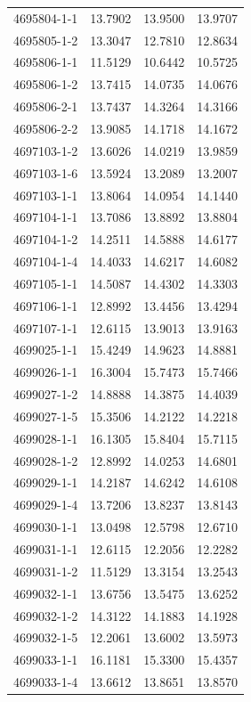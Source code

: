 \begin{longtable}{lrrr}
4695804-1-1 & 13.7902 & 13.9500 & 13.9707 \\
4695805-1-2 & 13.3047 & 12.7810 & 12.8634 \\
4695806-1-1 & 11.5129 & 10.6442 & 10.5725 \\
4695806-1-2 & 13.7415 & 14.0735 & 14.0676 \\
4695806-2-1 & 13.7437 & 14.3264 & 14.3166 \\
4695806-2-2 & 13.9085 & 14.1718 & 14.1672 \\
4697103-1-2 & 13.6026 & 14.0219 & 13.9859 \\
4697103-1-6 & 13.5924 & 13.2089 & 13.2007 \\
4697103-1-1 & 13.8064 & 14.0954 & 14.1440 \\
4697104-1-1 & 13.7086 & 13.8892 & 13.8804 \\
4697104-1-2 & 14.2511 & 14.5888 & 14.6177 \\
4697104-1-4 & 14.4033 & 14.6217 & 14.6082 \\
4697105-1-1 & 14.5087 & 14.4302 & 14.3303 \\
4697106-1-1 & 12.8992 & 13.4456 & 13.4294 \\
4697107-1-1 & 12.6115 & 13.9013 & 13.9163 \\
4699025-1-1 & 15.4249 & 14.9623 & 14.8881 \\
4699026-1-1 & 16.3004 & 15.7473 & 15.7466 \\
4699027-1-2 & 14.8888 & 14.3875 & 14.4039 \\
4699027-1-5 & 15.3506 & 14.2122 & 14.2218 \\
4699028-1-1 & 16.1305 & 15.8404 & 15.7115 \\
4699028-1-2 & 12.8992 & 14.0253 & 14.6801 \\
4699029-1-1 & 14.2187 & 14.6242 & 14.6108 \\
4699029-1-4 & 13.7206 & 13.8237 & 13.8143 \\
4699030-1-1 & 13.0498 & 12.5798 & 12.6710 \\
4699031-1-1 & 12.6115 & 12.2056 & 12.2282 \\
4699031-1-2 & 11.5129 & 13.3154 & 13.2543 \\
4699032-1-1 & 13.6756 & 13.5475 & 13.6252 \\
4699032-1-2 & 14.3122 & 14.1883 & 14.1928 \\
4699032-1-5 & 12.2061 & 13.6002 & 13.5973 \\
4699033-1-1 & 16.1181 & 15.3300 & 15.4357 \\
4699033-1-4 & 13.6612 & 13.8651 & 13.8570 \\

\end{longtable}
